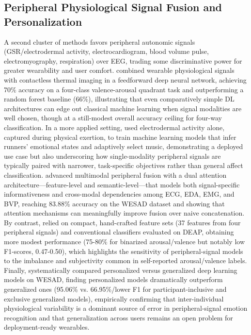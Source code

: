 \subsection{Peripheral Physiological Signal Fusion and Personalization}
A second cluster of methods favors peripheral autonomic signals (GSR/electrodermal activity, electrocardiogram, blood volume pulse, electromyography, respiration) over EEG, trading some discriminative power for greater wearability and user comfort. \cite{filippini2022automated} combined wearable physiological signals with contactless thermal imaging in a feedforward deep neural network, achieving 70\% accuracy on a four-class valence-arousal quadrant task and outperforming a random forest baseline (66\%), illustrating that even comparatively simple DL architectures can edge out classical machine learning when signal modalities are well chosen, though at a still-modest overall accuracy ceiling for four-way classification. In a more applied setting, \cite{baldassarri2023wearables} used electrodermal activity alone, captured during physical exertion, to train machine learning models that infer runners' emotional states and adaptively select music, demonstrating a deployed use case but also underscoring how single-modality peripheral signals are typically paired with narrower, task-specific objectives rather than general affect classification. \cite{zou2024emotion} advanced multimodal peripheral fusion with a dual attention architecture---feature-level and semantic-level---that models both signal-specific informativeness and cross-modal dependencies among ECG, EDA, EMG, and BVP, reaching 83.88\% accuracy on the WESAD dataset and showing that attention mechanisms can meaningfully improve fusion over naive concatenation. By contrast, \cite{kumar2024machine} relied on compact, hand-crafted feature sets (37 features from four peripheral signals) and conventional classifiers evaluated on DEAP, obtaining more modest performance (75-80\% for binarized arousal/valence but notably low F1-scores, 0.47-0.50), which highlights the sensitivity of peripheral-signal models to the imbalance and subjectivity common in self-reported arousal/valence labels. Finally, \cite{li2024comparison} systematically compared personalized versus generalized deep learning models on WESAD, finding personalized models dramatically outperform generalized ones (95.06\% vs. 66.95\%/lower F1 for participant-inclusive and exclusive generalized models), empirically confirming that inter-individual physiological variability is a dominant source of error in peripheral-signal emotion recognition and that generalization across users remains an open problem for deployment-ready wearables.


